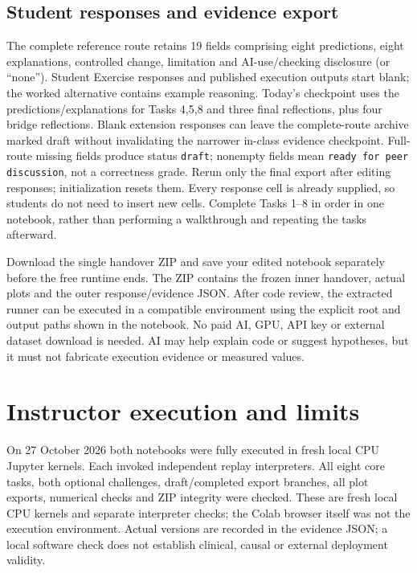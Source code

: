 \subsection{Student responses and evidence export}
The complete reference route retains 19 fields comprising eight predictions, eight explanations, controlled change, limitation and AI-use/checking disclosure (or ``none''). Student Exercise responses and published execution outputs start blank; the worked alternative contains example reasoning. Today's checkpoint uses the predictions/explanations for Tasks 4,5,8 and three final reflections, plus four bridge reflections. Blank extension responses can leave the complete-route archive marked draft without invalidating the narrower in-class evidence checkpoint. Full-route missing fields produce status \texttt{draft}; nonempty fields mean \texttt{ready for peer discussion}, not a correctness grade. Rerun only the final export after editing responses; initialization resets them. Every response cell is already supplied, so students do not need to insert new cells. Complete Tasks 1--8 in order in one notebook, rather than performing a walkthrough and repeating the tasks afterward.

Download the single handover ZIP and save your edited notebook separately before the free runtime ends. The ZIP contains the frozen inner handover, actual plots and the outer response/evidence JSON. After code review, the extracted runner can be executed in a compatible environment using the explicit root and output paths shown in the notebook. No paid AI, GPU, API key or external dataset download is needed. AI may help explain code or suggest hypotheses, but it must not fabricate execution evidence or measured values.

\section{Instructor execution and limits}
On 27 October 2026 both notebooks were fully executed in fresh local CPU Jupyter kernels. Each invoked independent replay interpreters. All eight core tasks, both optional challenges, draft/completed export branches, all plot exports, numerical checks and ZIP integrity were checked. These are fresh local CPU kernels and separate interpreter checks; the Colab browser itself was not the execution environment. Actual versions are recorded in the evidence JSON; a local software check does not establish clinical, causal or external deployment validity.

